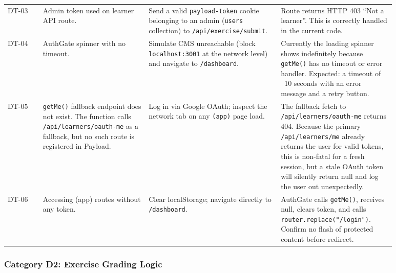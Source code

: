 \begin{longtable}{p{0.08\linewidth} p{0.24\linewidth} p{0.30\linewidth} p{0.26\linewidth}}
DT-03 & Admin token used on learner API route. & Send a valid \texttt{payload-token} cookie belonging to an admin (\texttt{users} collection) to \texttt{/api/exercise/submit}. & Route returns HTTP 403 ``Not a learner''. This is correctly handled in the current code. \\
DT-04 & AuthGate spinner with no timeout. & Simulate CMS unreachable (block \texttt{localhost:3001} at the network level) and navigate to \texttt{/dashboard}. & Currently the loading spinner shows indefinitely because \texttt{getMe()} has no timeout or error handler. Expected: a timeout of ~10 seconds with an error message and a retry button. \\
DT-05 & \texttt{getMe()} fallback endpoint does not exist. The function calls \texttt{/api/learners/oauth-me} as a fallback, but no such route is registered in Payload. & Log in via Google OAuth; inspect the network tab on any \texttt{(app)} page load. & The fallback fetch to \texttt{/api/learners/oauth-me} returns 404. Because the primary \texttt{/api/learners/me} already returns the user for valid tokens, this is non-fatal for a fresh session, but a stale OAuth token will silently return null and log the user out unexpectedly. \\
DT-06 & Accessing (app) routes without any token. & Clear localStorage; navigate directly to \texttt{/dashboard}. & AuthGate calls \texttt{getMe()}, receives null, clears token, and calls \texttt{router.replace("/login")}. Confirm no flash of protected content before redirect. \\
\bottomrule
\end{longtable}

\subsubsection{Category D2: Exercise Grading Logic}

